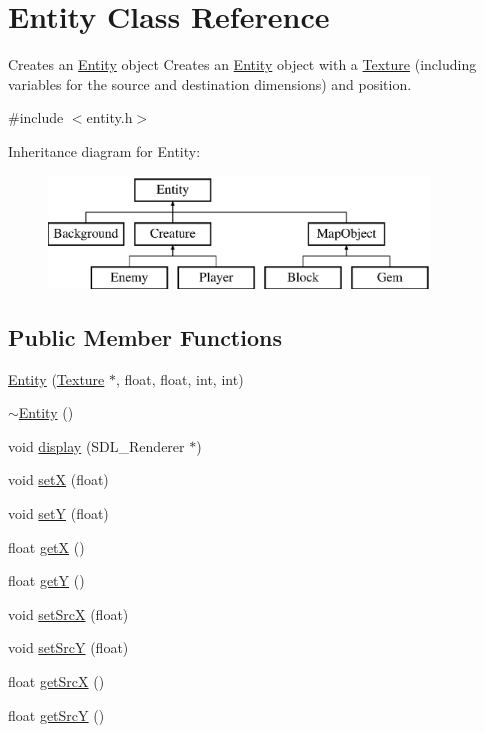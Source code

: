 \hypertarget{class_entity}{\section{Entity Class Reference}
\label{class_entity}
}


Creates an \hyperlink{class_entity}{Entity} object Creates an \hyperlink{class_entity}{Entity} object with a \hyperlink{class_texture}{Texture} (including variables for the source and destination dimensions) and position.  




{\ttfamily \#include $<$entity.\+h$>$}

Inheritance diagram for Entity\+:\begin{figure}[H]
\begin{center}
\leavevmode
\includegraphics[height=3.000000cm]{class_entity}
\end{center}
\end{figure}
\subsection*{Public Member Functions}
\begin{DoxyCompactItemize}
\item 
\hyperlink{class_entity_a8a572d724b689de57d3c0d8bafeff107}{Entity} (\hyperlink{class_texture}{Texture} $\ast$, float, float, int, int)
\item 
\hyperlink{class_entity_adf6d3f7cb1b2ba029b6b048a395cc8ae}{$\sim$\+Entity} ()
\item 
void \hyperlink{class_entity_a2224871711ac97a54af338ddefc25ac9}{display} (S\+D\+L\+\_\+\+Renderer $\ast$)
\item 
void \hyperlink{class_entity_a38e2f110d39426ba4823296b4294dd74}{set\+X} (float)
\item 
void \hyperlink{class_entity_a8896110a266bdec69b14d34ec6374df8}{set\+Y} (float)
\item 
float \hyperlink{class_entity_abc5b6d26c039bf3bf6faa766990768b4}{get\+X} ()
\item 
float \hyperlink{class_entity_ab6dd7b404c13754202acfe3d2c65c77b}{get\+Y} ()
\item 
void \hyperlink{class_entity_ad59969bacea528293341a88a94f845be}{set\+Src\+X} (float)
\item 
void \hyperlink{class_entity_a1051f4e046b0de7f4c727e0e0edb3f6f}{set\+Src\+Y} (float)
\item 
float \hyperlink{class_entity_ab5beec470bd31ee9d48252125e5efa96}{get\+Src\+X} ()
\item 
float \hyperlink{class_entity_a3780d51293a1e1f7fd3e32cdc6852b74}{get\+Src\+Y} ()
\end{DoxyCompactItemize}
